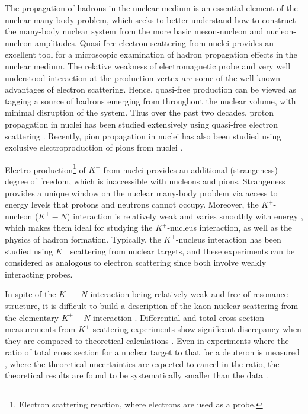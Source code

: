 %

%
%
\label{Experimental Motivation}
The propagation of hadrons in the nuclear medium is an essential element of the nuclear many-body problem, which seeks to better understand how to construct the many-body nuclear system from the more basic meson-nucleon and nucleon-nucleon amplitudes. Quasi-free electron scattering from nuclei provides an excellent tool for a microscopic examination of hadron propagation effects in the nuclear medium. The relative weakness of electromagnetic probe and very well understood interaction at the production vertex are some of the well known advantages of electron scattering. Hence, quasi-free production can be viewed as tagging a source of hadrons emerging from throughout the nuclear volume, with minimal disruption of the system. Thus over the past two decades, proton propagation in nuclei has been studied extensively using quasi-free electron scattering \cite{bates,ne18,ON95,Abb95,jlabp2}. Recently, pion propagation in nuclei has also been studied using exclusive electroproduction of pions from nuclei \cite{jlabpi1,jlabpi2}. 

Electro-production\footnote{Electron scattering reaction, where electrons are used as a probe.} of $K^+$ from nuclei provides an additional (strangeness) degree of freedom, which is inaccessible with nucleons and pions. Strangeness provides a unique window on the nuclear many-body problem via access to energy levels that protons and neutrons cannot occupy. Moreover, the $K^+$-nucleon ($K^+-N$) interaction is relatively weak and varies smoothly with energy \cite{dover77}, which makes them ideal for studying the $K^+$-nucleus interaction, as well as the physics of hadron formation. Typically, the $K^+$-nucleus interaction has been studied using $K^+$ scattering from nuclear targets, and these experiments can be considered as analogous to electron scattering since both involve weakly interacting probes.  

In spite of the $K^+-N$ interaction being relatively weak and free of resonance structure, it is difficult to build a description of the kaon-nuclear scattering from the elementary $K^+-N$ interaction \cite{skg1}. Differential and total cross section measurements \cite{kccexpt1,kccexpt2,kccexpt3,kccexpt5,kccexpt6} from  $K^+$ scattering experiments show significant discrepancy when they are compared to theoretical calculations \cite{skg1,kccth1,kccth2,kccth3}. Even in experiments where the ratio of total cross section for a nuclear target to that for a deuteron is measured \cite{kccexpt1,kccexpt2,kccexpt3,kccexpt5,kccexpt5,kccexpt6}, where the theoretical uncertainties are expected to cancel in the ratio, the theoretical results are found to be systematically smaller than the data \cite{skg1, kccth1,kccth2,kccth3}.

